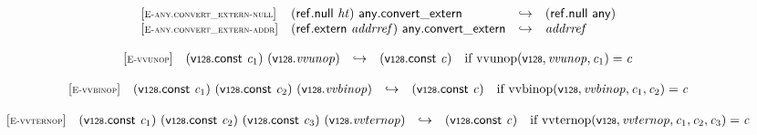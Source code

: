 \vspace{1ex}

$$
\begin{array}{@{}l@{}lcl@{}l@{}}
{[\textsc{\scriptsize E{-}any.convert\_extern{-}null}]} \quad & (\mathsf{ref.null}~{\mathit{ht}})~\mathsf{any.convert\_extern} &\hookrightarrow& (\mathsf{ref.null}~\mathsf{any}) &  \\
{[\textsc{\scriptsize E{-}any.convert\_extern{-}addr}]} \quad & (\mathsf{ref.extern}~{\mathit{addrref}})~\mathsf{any.convert\_extern} &\hookrightarrow& {\mathit{addrref}} &  \\
\end{array}
$$

\vspace{1ex}

$$
\begin{array}{@{}l@{}lcl@{}l@{}}
{[\textsc{\scriptsize E{-}vvunop}]} \quad & (\mathsf{v{\scriptstyle128}}.\mathsf{const}~{\mathit{c}}_{{1}})~(\mathsf{v{\scriptstyle128}} . {\mathit{vvunop}}) &\hookrightarrow& (\mathsf{v{\scriptstyle128}}.\mathsf{const}~{\mathit{c}}) &\quad
  \mbox{if}~{\mathrm{vvunop}}(\mathsf{v{\scriptstyle128}}, {\mathit{vvunop}}, {\mathit{c}}_{{1}}) = {\mathit{c}} \\
\end{array}
$$

\vspace{1ex}

$$
\begin{array}{@{}l@{}lcl@{}l@{}}
{[\textsc{\scriptsize E{-}vvbinop}]} \quad & (\mathsf{v{\scriptstyle128}}.\mathsf{const}~{\mathit{c}}_{{1}})~(\mathsf{v{\scriptstyle128}}.\mathsf{const}~{\mathit{c}}_{{2}})~(\mathsf{v{\scriptstyle128}} . {\mathit{vvbinop}}) &\hookrightarrow& (\mathsf{v{\scriptstyle128}}.\mathsf{const}~{\mathit{c}}) &\quad
  \mbox{if}~{\mathrm{vvbinop}}(\mathsf{v{\scriptstyle128}}, {\mathit{vvbinop}}, {\mathit{c}}_{{1}}, {\mathit{c}}_{{2}}) = {\mathit{c}} \\
\end{array}
$$

\vspace{1ex}

$$
\begin{array}{@{}l@{}lcl@{}l@{}}
{[\textsc{\scriptsize E{-}vvternop}]} \quad & (\mathsf{v{\scriptstyle128}}.\mathsf{const}~{\mathit{c}}_{{1}})~(\mathsf{v{\scriptstyle128}}.\mathsf{const}~{\mathit{c}}_{{2}})~(\mathsf{v{\scriptstyle128}}.\mathsf{const}~{\mathit{c}}_{{3}})~(\mathsf{v{\scriptstyle128}} . {\mathit{vvternop}}) &\hookrightarrow& (\mathsf{v{\scriptstyle128}}.\mathsf{const}~{\mathit{c}}) &\quad
  \mbox{if}~{\mathrm{vvternop}}(\mathsf{v{\scriptstyle128}}, {\mathit{vvternop}}, {\mathit{c}}_{{1}}, {\mathit{c}}_{{2}}, {\mathit{c}}_{{3}}) = {\mathit{c}} \\
\end{array}
$$

